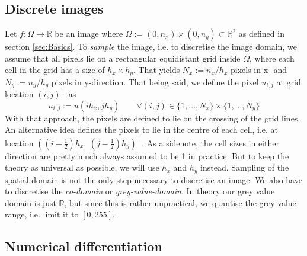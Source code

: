 \subsection{Discrete images}
Let $f:\Omega \rightarrow \mathbb{R}$ be an image where $\Omega
:= (0, n_x)\times(0, n_y) \subset \mathbb{R}^2$ as defined in section \ref{sec:Basics}. To
\textit{sample} the image, i.e. to discretise the image domain, we assume that all pixels lie on a
rectangular equidistant grid inside $\Omega$, where each cell in the grid has a size of $h_x
\times h_y$.
That yields $N_x := n_x/h_x$ pixels in x- and $N_y := n_y/h_y$ pixels in
y-direction.
That being said, we define the pixel $u_{i,j}$ at grid location $(i, j)^\top$ as
\begin{equation}
    u_{i, j} := u(ih_x, jh_y)\qquad \forall(i ,j) \in \{1,\dots,N_x\}\times\{1,\dots,N_y\}
\end{equation}
With that approach, the pixels are defined to lie on the crossing of the grid lines.
An alternative idea defines the pixels to lie in the centre of each cell, i.e. at location 
$((i-\frac{1}{2})h_x,\ (j- \frac{1}{2})h_y)^\top$.
As a sidenote, the cell sizes in either direction are pretty much always assumed to be 1 in 
practice. 
But to keep the theory as universal as possible, we will use $h_x$ and $h_y$ instead.
Sampling of the spatial domain is not the only step necessary to discretise an image. We also have
to discretise the \textit{co-domain} or \textit{grey-value-domain}. In theory our grey value domain
is just $\mathbb{R}$, but since this is rather unpractical, we quantise the grey value range, i.e.
limit it to $[0, 255]$.

\subsection{Numerical differentiation}

